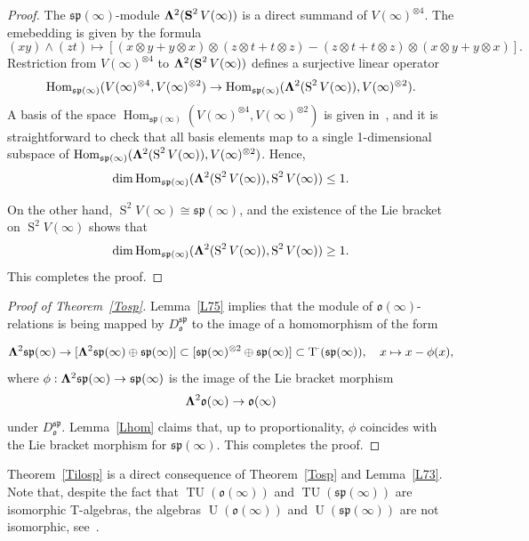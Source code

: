 \documentclass{emsprocart}
\begin{document}
\begin{proof} The $\mathfrak{sp}(\infty)$-module ${\bf \Lambda}^2(\operatorname{\bf S}^2V(\infty))$ is a direct summand of $V(\infty)^{\otimes 4}$. The emebedding is given by the formula
$$(xy)\wedge (zt)\mapsto [(x\otimes y+y\otimes x)\otimes(z\otimes t+t\otimes z)-(z\otimes t+t\otimes z)\otimes(x\otimes y+y\otimes x)].$$
Restriction from $V(\infty)^{\otimes 4}$ to ${\bf \Lambda}^2(\operatorname{\bf S}^2V(\infty))$ defines a surjective linear operator $$\operatorname{Hom}_{\mathfrak{sp}(\infty)}(V(\infty)^{\otimes 4}, V(\infty)^{\otimes 2})\to \operatorname{Hom}_{\mathfrak{sp}(\infty)}({\bf \Lambda}^2(\operatorname{S}^2V(\infty)), V(\infty)^{\otimes 2}).$$
A basis of the space $\operatorname{Hom}_{\mathfrak{sp}(\infty)}(V(\infty)^{\otimes 4}, V(\infty)^{\otimes 2})$ is given in~\cite[Lemma~6.1]{PSt}, and it is straightforward to check that all basis elements map to a single 1-dimensional subspace of $\operatorname{Hom}_{\mathfrak{sp}(\infty)}({\bf \Lambda}^2(\operatorname{S}^2V(\infty)), V(\infty)^{\otimes 2})$. Hence, $$\dim\operatorname{Hom}_{\mathfrak{sp}(\infty)}({\bf \Lambda}^2(\operatorname{S}^2V(\infty)), \operatorname{S}^2V(\infty))\le1.$$

On the other hand, $\operatorname{S}^2V(\infty)\cong\mathfrak{sp}(\infty)$, and the existence of the Lie bracket on $\operatorname{S}^2V(\infty)$ shows that $$\dim\operatorname{Hom}_{\mathfrak{sp}(\infty)}({\bf \Lambda}^2(\operatorname{S}^2V(\infty)), \operatorname{S}^2V(\infty))\ge1.$$ This completes the proof.\end{proof}
\begin{proof}[Proof of Theorem~\ref{Tosp}] Lemma~\ref{L75} implies that the module of $\mathfrak o(\infty)$-relations is being mapped by $D_\mathfrak o^{\mathfrak{sp}}$ to the image of a homomorphism of the form

$${\bf \Lambda}^2\mathfrak{sp}(\infty)\to [{\bf \Lambda}^2\mathfrak{sp}(\infty)\oplus\mathfrak{sp}(\infty)]\subset[\mathfrak{sp}(\infty)^{\otimes2}\oplus\mathfrak{sp}(\infty)]\subset \operatorname{T}^{\cdot}
(\mathfrak{sp}(\infty)),\hspace{10pt} x\mapsto x-\phi(x),$$
where $\phi:{\bf \Lambda}^2\mathfrak{sp}(\infty)\to\mathfrak{sp}(\infty)$ is the image of the Lie bracket morphism $${\bf \Lambda}^2\mathfrak o(\infty)\to\mathfrak o(\infty)$$ under $D_\mathfrak o^\mathfrak{sp}$. Lemma~\ref{Lhom} claims that, up to proportionality, $\phi$ coincides with the Lie bracket morphism for $\mathfrak{sp}(\infty)$. This completes the proof.
\end{proof}
Theorem~\ref{Tilosp} is a direct consequence of Theorem~\ref{Tosp} and Lemma~\ref{L73}. Note that, despite the fact that $\operatorname{TU}(\mathfrak o(\infty))$ and $\operatorname{TU}(\mathfrak{sp}(\infty))$ are isomorphic T-algebras, the algebras $\operatorname{U}(\mathfrak{o}(\infty))$ and $\operatorname{U}(\mathfrak{sp}(\infty))$ are not isomorphic, see~\cite{PP1}.
\end{document}
